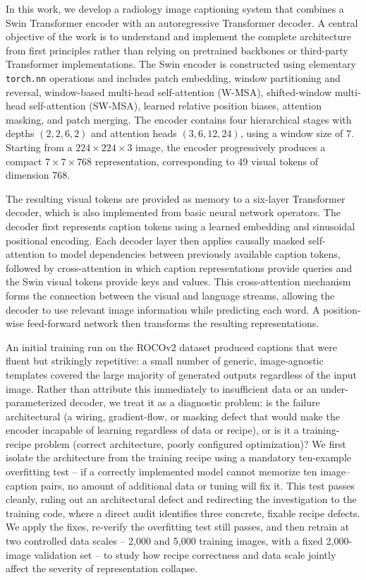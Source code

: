 \documentclass[conference]{IEEEtran}
\begin{document}
In this work, we develop a radiology image captioning system that combines a Swin Transformer encoder with an autoregressive Transformer decoder. A central objective of the work is to understand and implement the complete architecture from first principles rather than relying on pretrained backbones or third-party Transformer implementations. The Swin encoder is constructed using elementary \texttt{torch.nn} operations and includes patch embedding, window partitioning and reversal, window-based multi-head self-attention (W-MSA), shifted-window multi-head self-attention (SW-MSA), learned relative position biases, attention masking, and patch merging. The encoder contains four hierarchical stages with depths $(2,2,6,2)$ and attention heads $(3,6,12,24)$, using a window size of $7$. Starting from a $224\times224\times3$ image, the encoder progressively produces a compact $7\times7\times768$ representation, corresponding to 49 visual tokens of dimension 768.

The resulting visual tokens are provided as memory to a six-layer Transformer decoder, which is also implemented from basic neural network operators. The decoder first represents caption tokens using a learned embedding and sinusoidal positional encoding. Each decoder layer then applies causally masked self-attention to model dependencies between previously available caption tokens, followed by cross-attention in which caption representations provide queries and the Swin visual tokens provide keys and values. This cross-attention mechanism forms the connection between the visual and language streams, allowing the decoder to use relevant image information while predicting each word. A position-wise feed-forward network then transforms the resulting representations.

An initial training run on the ROCOv2 dataset produced captions that were fluent but strikingly repetitive: a small number of generic, image-agnostic templates covered the large majority of generated outputs regardless of the input image. Rather than attribute this immediately to insufficient data or an under-parameterized decoder, we treat it as a diagnostic problem: is the failure architectural (a wiring, gradient-flow, or masking defect that would make the encoder incapable of learning regardless of data or recipe), or is it a training-recipe problem (correct architecture, poorly configured optimization)? We first isolate the architecture from the training recipe using a mandatory ten-example overfitting test -- if a correctly implemented model cannot memorize ten image--caption pairs, no amount of additional data or tuning will fix it. This test passes cleanly, ruling out an architectural defect and redirecting the investigation to the training code, where a direct audit identifies three concrete, fixable recipe defects. We apply the fixes, re-verify the overfitting test still passes, and then retrain at two controlled data scales -- 2,000 and 5,000 training images, with a fixed 2,000-image validation set -- to study how recipe correctness and data scale jointly affect the severity of representation collapse.
\end{document}
